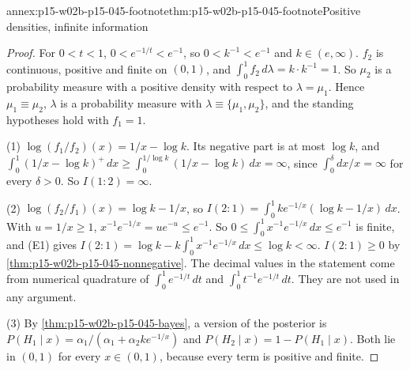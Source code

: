 \begin{annexitem}{annex:p15-w02b-p15-045-footnote}{thm:p15-w02b-p15-045-footnote}{Positive densities, infinite information}
\begin{proof}
For \(0<t<1\), \(0<e^{-1/t}<e^{-1}\), so \(0<k^{-1}<e^{-1}\) and
\(k\in(e,\infty)\). \(f_2\) is continuous, positive and finite on
\((0,1)\), and \(\int_0^1f_2\,d\lambda=k\cdot k^{-1}=1\). So \(\mu_2\) is
a probability measure with a positive density with respect to
\(\lambda=\mu_1\). Hence \(\mu_1\equiv\mu_2\), \(\lambda\) is a
probability measure with \(\lambda\equiv\{\mu_1,\mu_2\}\), and the
standing hypotheses hold with \(f_1=1\).

(1) \(\log(f_1/f_2)(x)=1/x-\log k\). Its negative part is at most
\(\log k\), and
\(\int_0^1(1/x-\log k)^+\,dx\geq\int_0^{1/\log k}(1/x-\log k)\,dx=\infty\),
since \(\int_0^\delta dx/x=\infty\) for every \(\delta>0\). So
\(I(1:2)=\infty\).

(2) \(\log(f_2/f_1)(x)=\log k-1/x\), so
\(I(2:1)=\int_0^1ke^{-1/x}(\log k-1/x)\,dx\). With \(u=1/x\geq1\),
\(x^{-1}e^{-1/x}=ue^{-u}\leq e^{-1}\). So
\(0\leq\int_0^1x^{-1}e^{-1/x}\,dx\leq e^{-1}\) is finite, and (E1) gives
\(I(2:1)=\log k-k\int_0^1x^{-1}e^{-1/x}\,dx\leq\log k<\infty\).
\(I(2:1)\geq0\) by \cref{thm:p15-w02b-p15-045-nonnegative}. The decimal
values in the statement come from numerical quadrature of
\(\int_0^1e^{-1/t}\,dt\) and \(\int_0^1t^{-1}e^{-1/t}\,dt\). They are
not used in any argument.

(3) By \cref{thm:p15-w02b-p15-045-bayes}, a version of the posterior is
\(P(H_1\mid x)=\alpha_1/(\alpha_1+\alpha_2ke^{-1/x})\) and
\(P(H_2\mid x)=1-P(H_1\mid x)\). Both lie in \((0,1)\) for every
\(x\in(0,1)\), because every term is positive and finite.
\end{proof}
\end{annexitem}

